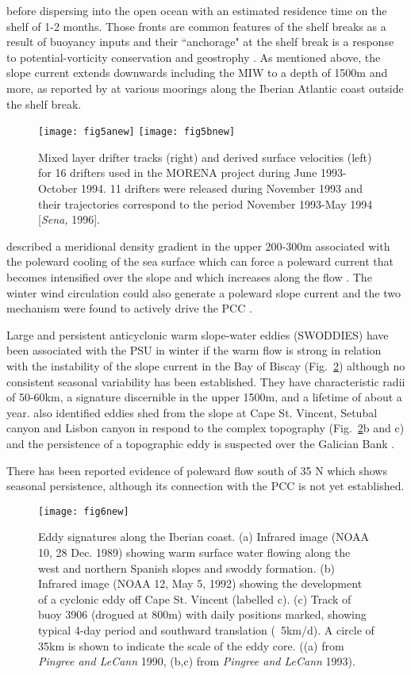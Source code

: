 before dispersing into the open ocean with an estimated residence
time on the shelf of 1-2 months\citep{Fiuza96b}. Those fronts are
common features of the shelf breaks as a result of buoyancy inputs
and their ``anchorage" at the shelf break is a response to
potential-vorticity conservation and geostrophy \citep{Condie93}.
As mentioned above, the slope current extends downwards including
the MIW to a depth of 1500m and more, as reported by
\citet{Huthnance02} at various moorings along the Iberian Atlantic
coast outside the shelf break.
\begin{figure}
  \centering
  \texttt{[image: fig5anew]}
    \texttt{[image: fig5bnew]}
  \caption{Mixed layer drifter tracks (right) and derived surface
  velocities (left) for 16 drifters used in the MORENA project
  during June 1993-October 1994. 11 drifters were released during
  November 1993 and their trajectories correspond to the period
  November 1993-May 1994 [{\it Sena,} 1996].}\label{fig:morenadrifters}
\end{figure}

\citet{Pollard85} described a meridional density gradient in the
upper 200-300m associated with the poleward cooling of the sea
surface which can force a poleward current that becomes
intensified over the slope and which increases along the flow
\citep{Huthnance84}. The winter wind circulation could also
generate a poleward slope current and the two mechanism were found
to actively drive the PCC \citep{Frouin90}.

Large and persistent anticyclonic warm slope-water eddies
(SWODDIES) have been associated with the PSU in winter if the warm
flow is strong \citep{Pingree94} in relation with the instability
of the slope current in the Bay of Biscay
(Fig.~\ref{fig:swoddies}) although no consistent seasonal
variability has been established. They have characteristic radii
of 50-60km, a signature discernible in the upper 1500m, and a
lifetime of about a year. \citet{Pingree93} also identified eddies
shed from the slope at Cape St. Vincent, Setubal canyon and Lisbon
canyon in respond to the complex topography
(Fig.~\ref{fig:swoddies}b and c) and the persistence of a
topographic eddy is suspected over the Galician Bank
\citep{Hill98}.

There has been reported evidence of poleward flow south of 35\deg
N \citep[i.e. off NW Africa][]{Barton90,Mittelstaed91} which shows
seasonal persistence, although its connection with the PCC is not
yet established.
\begin{figure}
  \centering
  \texttt{[image: fig6new]}
  \caption{Eddy signatures along the Iberian coast. (a)  Infrared
  image (NOAA 10, 28 Dec. 1989) showing warm surface water flowing
  along the west and northern Spanish slopes and swoddy formation.
  (b) Infrared image (NOAA 12, May 5, 1992) showing the
  development of a cyclonic eddy off Cape St. Vincent (labelled
  c). (c) Track of buoy 3906 (drogued at 800m) with daily
  positions marked, showing typical 4-day period and southward
  translation (~5km/d). A circle of 35km is shown to indicate the
  scale of the eddy core. ((a) from {\it Pingree and LeCann} 1990, (b,c)
  from {\it Pingree and LeCann} 1993).}\label{fig:swoddies}
\end{figure}
